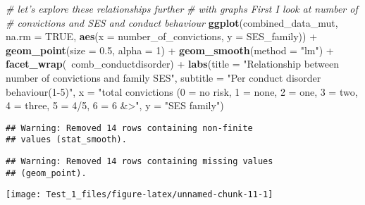\documentclass[]{tufte-handout}
\newenvironment{Shaded}{}{}
\newcommand{\KeywordTok}[1]{\textcolor[rgb]{0.00,0.44,0.13}{\textbf{#1}}}
\newcommand{\DataTypeTok}[1]{\textcolor[rgb]{0.56,0.13,0.00}{#1}}
\newcommand{\DecValTok}[1]{\textcolor[rgb]{0.25,0.63,0.44}{#1}}
\newcommand{\FloatTok}[1]{\textcolor[rgb]{0.25,0.63,0.44}{#1}}
\newcommand{\StringTok}[1]{\textcolor[rgb]{0.25,0.44,0.63}{#1}}
\newcommand{\CommentTok}[1]{\textcolor[rgb]{0.38,0.63,0.69}{\textit{#1}}}
\newcommand{\OtherTok}[1]{\textcolor[rgb]{0.00,0.44,0.13}{#1}}
\newcommand{\OperatorTok}[1]{\textcolor[rgb]{0.40,0.40,0.40}{#1}}
\newcommand{\NormalTok}[1]{#1}
\begin{document}
\begin{Shaded}
\begin{Highlighting}[]
\CommentTok{# let's explore these relationships further}
\CommentTok{# with graphs First I look at number of}
\CommentTok{# convictions and SES and conduct behaviour}
\KeywordTok{ggplot}\NormalTok{(combined_data_mut, }\DataTypeTok{na.rm =} \OtherTok{TRUE}\NormalTok{, }\KeywordTok{aes}\NormalTok{(}\DataTypeTok{x =}\NormalTok{ number_of_convictions, }
    \DataTypeTok{y =}\NormalTok{ SES_family)) }\OperatorTok{+}\StringTok{ }\KeywordTok{geom_point}\NormalTok{(}\DataTypeTok{size =} \FloatTok{0.5}\NormalTok{, }
    \DataTypeTok{alpha =} \DecValTok{1}\NormalTok{) }\OperatorTok{+}\StringTok{ }\KeywordTok{geom_smooth}\NormalTok{(}\DataTypeTok{method =} \StringTok{"lm"}\NormalTok{) }\OperatorTok{+}\StringTok{ }
\StringTok{    }\KeywordTok{facet_wrap}\NormalTok{(}\OperatorTok{~}\NormalTok{comb_conductdisorder) }\OperatorTok{+}\StringTok{ }\KeywordTok{labs}\NormalTok{(}\DataTypeTok{title =} \StringTok{"Relationship between number of convictions and family SES"}\NormalTok{, }
    \DataTypeTok{subtitle =} \StringTok{"Per conduct disorder behaviour(1-5)"}\NormalTok{, }
    \DataTypeTok{x =} \StringTok{"total convictions (0 = no risk, 1 = none, 2 = one, 3 = two, 4 = three, 5 = 4/5, 6 = 6 &>"}\NormalTok{, }
    \DataTypeTok{y =} \StringTok{"SES family"}\NormalTok{)}
\end{Highlighting}
\end{Shaded}

\begin{verbatim}
## Warning: Removed 14 rows containing non-finite
## values (stat_smooth).
\end{verbatim}

\begin{verbatim}
## Warning: Removed 14 rows containing missing values
## (geom_point).
\end{verbatim}

\texttt{[image: Test\_1\_files/figure-latex/unnamed-chunk-11-1]}
\end{document}
